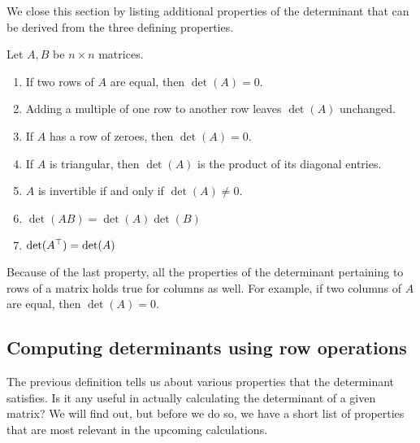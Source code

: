 \documentclass{ximera}
\begin{document}
We close this section by listing additional properties of the
determinant that can be derived from the three defining properties.

\begin{theorem}
  Let $A, B$ be $n \times n$ matrices.
  \begin{enumerate}
  \item If two rows of $A$ are equal, then $\det (A) = 0$.
  \item Adding a multiple of one row to another row leaves $\det (A)$
    unchanged.
  \item If $A$ has a row of zeroes, then $\det (A) = 0$.
  \item If $A$ is triangular, then $\det (A)$ is the product of its
    diagonal entries.
  \item $A$ is invertible if and only if $\det (A) \neq 0$.
  \item $\det (AB) = \det(A) \det(B)$
  \item $\det (A^\top) = \det(A)$
  \end{enumerate}
\end{theorem}

Because of the last property, all the properties of the determinant
pertaining to rows of a matrix holds true for columns as well. For
example, if two columns of $A$ are equal, then $\det(A) = 0$.


\subsection{Computing determinants using row operations}

The previous definition tells us about various properties that the
determinant satisfies. Is it any useful in actually calculating the
determinant of a given matrix? We will find out, but before we do so,
we have a short list of properties that are most relevant in the
upcoming calculations.
\end{document}
